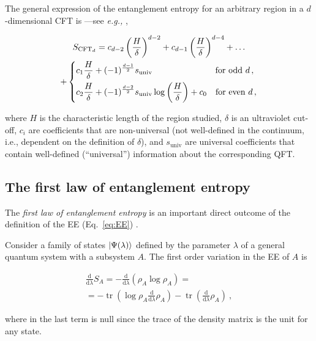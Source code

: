 \documentclass[twocolumn]{revtex4}
\providecommand{\eqgat}[2]{
    \begin{gather}
        #2
    \label{eq:#1}
    \end{gather}
}
\DeclareMathOperator{\tr}{tr}
\begin{document}
The general expression of the entanglement entropy for an arbitrary region in a $d$-dimensional CFT is ---see {\emph{e.g.,}} \cite{nishioka_entanglement_2018},
\eqgat{EE_CFT}{
    S_{\text{CFT}_d} = c_{d-2} \left( \frac{H}{\delta} \right) ^{d-2} + c_{d-1} \left( \frac{H}{\delta} \right) ^{d-4} + \dots  \\
    + \begin{dcases}
        c_1 \frac{H}{\delta} + (-1)^{\frac{d-1}{2}} s_{\text{univ}}
        \qquad \qquad \qquad \quad \ \text{for odd } d \, , \\
        c_2  \frac{H}{\delta} + (-1)^{\frac{d-2}{2}} s_{\text{univ}} \log \left ( \frac{H}{\delta} \right ) + c_0
        \quad \text{for even } d \, ,
    \end{dcases} \nonumber
}
where $H$ is the characteristic length of the region studied, $\delta$ is an ultraviolet cut-off, $c_i$ are coefficients that are non-universal (not well-defined in the continuum, i.e., dependent on the definition of $\delta$), and $s_{\text{univ}}$ are universal coefficients that contain well-defined (``universal'') information about the corresponding QFT.


\subsection{The first law of entanglement entropy}

The \emph{first law of entanglement entropy} is an important direct outcome of the definition of the EE (Eq.~\ref{eq:EE}) \cite{blanco_relative_2013}.

Consider a family of states $\ket{\Psi(\lambda)}$ defined by the parameter $\lambda$ of a general quantum system with a subsystem $A$. The first order variation in the EE of $A$ is \cite{van_raamsdonk_lectures_2017}
\eqgat{varEE}{
    \frac{\mathrm{d}}{\mathrm{d} \lambda} S_A = - \frac{\mathrm{d}}{\mathrm{d} \lambda} (\rho_A \log \rho_A) = \nonumber \\
    = - \tr \left( \log \rho_A \frac{\mathrm{d}}{\mathrm{d} \lambda} \rho_A \right) - \tr \left( \frac{\mathrm{d}}{\mathrm{d} \lambda} \rho_A \right) \ ,
}
where in the last term is null since the trace of the density matrix is the unit for any state.
\end{document}
